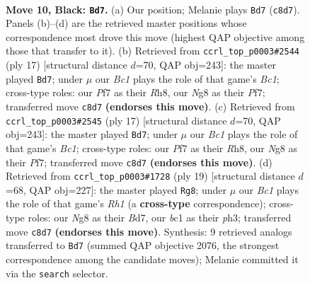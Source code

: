\documentclass[11pt]{article}
\begin{document}
\clearpage

\begin{figure}[p]\centering
\begin{subfigure}{0.46\textwidth}\centering
\resizebox{\linewidth}{!}{%
\newchessgame
\chessboard[
  setfen={r1b1kbnr/pp3p1p/1qn1p1p1/3pP3/1P1P2PP/P4N2/5P2/RNBQKB1R b KQkq - 0 10},
  showmover=false,
  pgfstyle=straightmove, color=movearrow, markmove={c8-d7}
]}
\caption{}
\end{subfigure}\hfill
\begin{subfigure}{0.46\textwidth}\centering
\resizebox{\linewidth}{!}{%
\newchessgame
\chessboard[
  setfen={r1b1kb1r/pp3ppp/1qn1p3/3pPn2/1P1P4/P4N2/1B3PPP/RN1QKB1R b KQkq - 2 9},
  showmover=false,
  pgfstyle=straightmove, color=movearrow, markmove={c8-d7}
]}
\caption{}
\end{subfigure}
\\[4pt]
\begin{subfigure}{0.46\textwidth}\centering
\resizebox{\linewidth}{!}{%
\newchessgame
\chessboard[
  setfen={r1b1kb1r/pp3ppp/1qn1p3/3pPn2/1P1P4/P4N2/1B3PPP/RN1QKB1R b KQkq - 2 9},
  showmover=false,
  pgfstyle=straightmove, color=movearrow, markmove={c8-d7}
]}
\caption{}
\end{subfigure}\hfill
\begin{subfigure}{0.46\textwidth}\centering
\resizebox{\linewidth}{!}{%
\newchessgame
\chessboard[
  setfen={r3kb1r/pp1b1p1p/1qn1p2p/3pP3/1P1P4/P4N1P/5PP1/RN1QKB1R b KQkq - 0 10},
  showmover=false,
  pgfstyle=straightmove, color=movearrow, markmove={h8-g8}
]}
\caption{}
\end{subfigure}
\caption{\textbf{Move 10, Black: \texttt{Bd7}.} (a) Our position; Melanie plays \texttt{Bd7} (\texttt{c8d7}). Panels (b)--(d) are the retrieved master positions whose correspondence most drove this move (highest QAP objective among those that transfer to it). (b) Retrieved from \texttt{ccrl\_top\_p0003\#2544} (ply 17) [structural distance $d$=70, QAP obj=243]: the master played \texttt{Bd7}; under $\mu$ our \emph{Bc1} plays the role of that game's \emph{Bc1}; cross-type roles: our \emph{P}f7 as their \emph{R}h8, our \emph{N}g8 as their \emph{P}f7; transferred move \texttt{c8d7} \textbf{(endorses this move)}. (c) Retrieved from \texttt{ccrl\_top\_p0003\#2545} (ply 17) [structural distance $d$=70, QAP obj=243]: the master played \texttt{Bd7}; under $\mu$ our \emph{Bc1} plays the role of that game's \emph{Bc1}; cross-type roles: our \emph{P}f7 as their \emph{R}h8, our \emph{N}g8 as their \emph{P}f7; transferred move \texttt{c8d7} \textbf{(endorses this move)}. (d) Retrieved from \texttt{ccrl\_top\_p0003\#1728} (ply 19) [structural distance $d$=68, QAP obj=227]: the master played \texttt{Rg8}; under $\mu$ our \emph{Bc1} plays the role of that game's \emph{Rh1} (a \textbf{cross-type} correspondence); cross-type roles: our \emph{N}g8 as their \emph{B}d7, our \emph{b}c1 as their \emph{p}h3; transferred move \texttt{c8d7} \textbf{(endorses this move)}. Synthesis: 9 retrieved analogs transferred to \texttt{Bd7} (summed QAP objective 2076, the strongest correspondence among the candidate moves); Melanie committed it via the \texttt{search} selector.}
\label{fig:thought-m19}
\end{figure}
\end{document}
